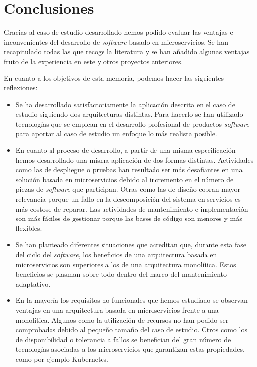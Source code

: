\documentclass[11pt,spanish,listoffigures]{tfgetsinf}
\begin{document}

\chapter{Conclusiones} \label{ch:Conclusiones}

Gracias al caso de estudio desarrollado hemos podido evaluar las ventajas e inconvenientes del desarrollo de \textit{software} basado en microservicios. Se han recapitulado todas las que recoge la literatura y se han añadido algunas ventajas fruto de la experiencia en este y otros proyectos anteriores. 

En cuanto a los objetivos de esta memoria, podemos hacer las siguientes reflexiones:

\begin{itemize}

\item Se ha desarrollado satisfactoriamente la aplicación descrita en el caso de estudio siguiendo dos arquitecturas distintas. Para hacerlo se han utilizado tecnologías que se emplean en el desarrollo profesional de productos \textit{software} para aportar al caso de estudio un enfoque lo más realista posible.

\item En cuanto al proceso de desarrollo, a partir de una misma especificación hemos desarrollado una misma aplicación de dos formas distintas. Actividades como las de despliegue o pruebas han resultado ser más desafiantes en una solución basada en microservicios debido al incremento en el número de piezas de \textit{software} que participan. Otras como las de diseño cobran mayor relevancia porque un fallo en la descomposición del sistema en servicios es más costoso de reparar. Las actividades de mantenimiento e implementación son más fáciles de gestionar porque las bases de código son menores y más flexibles.

\item Se han planteado diferentes situaciones que acreditan que, durante esta fase del ciclo del \textit{software}, los beneficios de una arquitectura basada en microservicios son superiores a los de una arquitectura monolítica. Estos beneficios se plasman sobre todo dentro del marco del mantenimiento adaptativo.

\item En la mayoría los requisitos no funcionales que hemos estudiado se observan ventajas en una arquitectura basada en microservicios frente a una monolítica. Algunos como la utilización de recursos no han podido ser comprobados debido al pequeño tamaño del caso de estudio. Otros como los de disponibilidad o tolerancia a fallos se benefician del gran número de tecnologías asociadas a los microservicios que garantizan estas propiedades, como por ejemplo Kubernetes.

\end{itemize}
\end{document}
